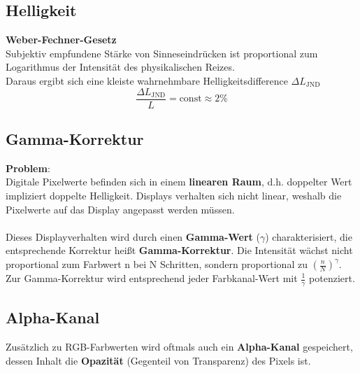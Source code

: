 \documentclass[10pt,a4paper]{article}
\begin{document}
        \subsection{Helligkeit}
        \textbf{Weber-Fechner-Gesetz}\\
        Subjektiv empfundene Stärke von Sinneseindrücken ist proportional zum Logarithmus der Intensität des
        physikalischen Reizes.\\

        Daraus ergibt sich eine kleiste wahrnehmbare Helligkeitsdifference \(\Delta L_\text{JND}\)
        \[\frac{\Delta L_\text{JND}}{L} = \text{const} \approx 2\%\]
        
	\subsection{Gamma-Korrektur}
	\label{bfp:sub:gamma_korrektur}

	\textbf{Problem}:\\
	Digitale Pixelwerte befinden sich in einem \textbf{linearen Raum}, d.h. doppelter Wert impliziert doppelte Helligkeit. Displays verhalten sich nicht linear, weshalb die Pixelwerte auf das Display angepasst werden müssen.
	\\\\
	Dieses Displayverhalten wird durch einen \textbf{Gamma-Wert} ($\gamma$) charakterisiert, die entsprechende Korrektur heißt \textbf{Gamma-Korrektur}. Die Intensität wächst nicht proportional zum Farbwert n bei N Schritten, sondern proportional zu $(\frac{n}{N})^{\gamma}$. Zur Gamma-Korrektur wird entsprechend jeder Farbkanal-Wert mit $\frac{1}{\gamma}$ potenziert.

	\subsection{Alpha-Kanal}
	\label{bfp:sub:alpha_kanal}
	
	Zusätzlich zu RGB-Farbwerten wird oftmals auch ein \textbf{Alpha-Kanal} gespeichert, dessen Inhalt die \textbf{Opazität} (Gegenteil von Transparenz) des Pixels ist.
\end{document}
